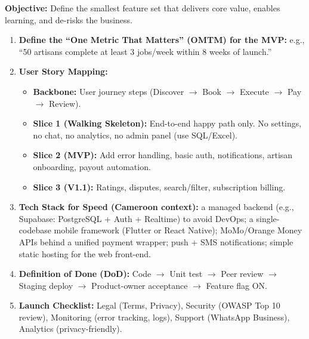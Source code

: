 \documentclass[11pt]{article}
\begin{document}
\begin{methode}
\textbf{Objective:} Define the smallest feature set that delivers core value, enables learning, and de-risks the business.
\begin{enumerate}
    \item \textbf{Define the ``One Metric That Matters'' (OMTM) for the MVP:} e.g., ``50 artisans complete at least 3 jobs/week within 8 weeks of launch.''
    \item \textbf{User Story Mapping:}
    \begin{itemize}
        \item \textbf{Backbone:} User journey steps (Discover $\to$ Book $\to$ Execute $\to$ Pay $\to$ Review).
        \item \textbf{Slice 1 (Walking Skeleton):} End-to-end happy path only. No settings, no chat, no analytics, no admin panel (use SQL/Excel).
        \item \textbf{Slice 2 (MVP):} Add error handling, basic auth, notifications, artisan onboarding, payout automation.
        \item \textbf{Slice 3 (V1.1):} Ratings, disputes, search/filter, subscription billing.
    \end{itemize}
    \item \textbf{Tech Stack for Speed (Cameroon context):} a managed backend (e.g., Supabase: PostgreSQL + Auth + Realtime) to avoid DevOps; a single-codebase mobile framework (Flutter or React Native); MoMo/Orange Money APIs behind a unified payment wrapper; push + SMS notifications; simple static hosting for the web front-end.
    \item \textbf{Definition of Done (DoD):} Code $\to$ Unit test $\to$ Peer review $\to$ Staging deploy $\to$ Product-owner acceptance $\to$ Feature flag ON.
    \item \textbf{Launch Checklist:} Legal (Terms, Privacy), Security (OWASP Top 10 review), Monitoring (error tracking, logs), Support (WhatsApp Business), Analytics (privacy-friendly).
\end{enumerate}
\end{methode}
\end{document}
